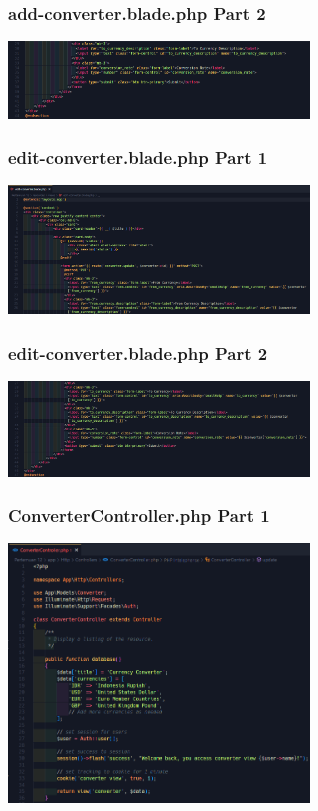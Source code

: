 \documentclass[aspectratio=169, table]{beamer}
\begin{document}
\begin{frame}[fragile]
 \frametitle{add-converter.blade.php Part 2}
 \vskip1cm
 \begin{center}
  \includegraphics[width=0.6\textwidth]{classFiles/pertemuan-12-view-part-2.png}
 \end{center}
\end{frame}

\begin{frame}[fragile]
 \frametitle{edit-converter.blade.php Part 1}
 \vskip1cm
 \begin{center}
  \includegraphics[width=0.6\textwidth]{classFiles/pertemuan-12-view-part-3.png}
 \end{center}
\end{frame}

\begin{frame}[fragile]
 \frametitle{edit-converter.blade.php Part 2}
 \vskip1cm
 \begin{center}
  \includegraphics[width=0.6\textwidth]{classFiles/pertemuan-12-view-part-4.png}
 \end{center}
\end{frame}

\begin{frame}[fragile]
 \frametitle{ConverterController.php Part 1}
 \vskip1cm
 \begin{center}
  \includegraphics[width=0.6\textwidth]{classFiles/pertemuan-12-controller-part-1.png}
 \end{center}
\end{frame}
\end{document}
